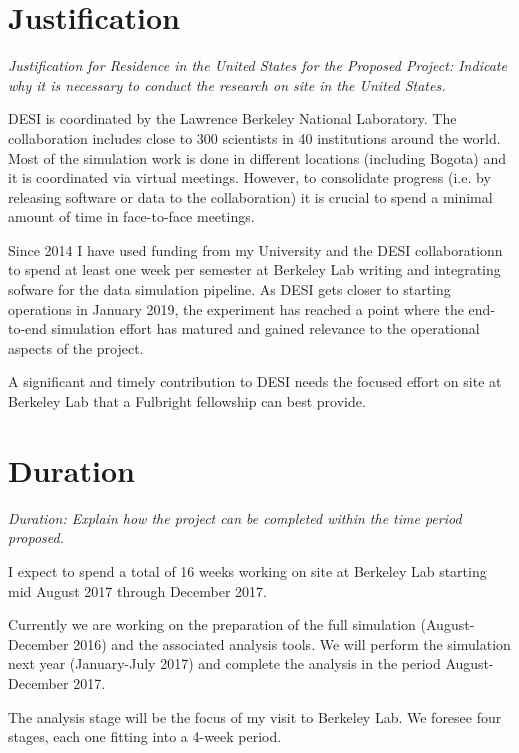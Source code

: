 \documentclass[12pt]{article}
\begin{document}
\section*{Justification}
\textit{Justification for Residence in the United States for the Proposed
Project: Indicate why it is necessary to conduct the research on site
 in the United States. }

DESI is coordinated by the Lawrence Berkeley National Laboratory. The
collaboration includes close to 300 scientists in 40 institutions
around the world. 
Most of the simulation work is done in different locations (including
Bogota) and it is coordinated via virtual meetings.  
However, to consolidate progress (i.e. by releasing software or data
to the collaboration) it is crucial to spend a minimal amount of time
in face-to-face meetings. 

Since 2014 I have used funding from my University and the DESI
collaborationn to spend at least one week per semester at
Berkeley Lab writing and integrating sofware for the data simulation
pipeline. 
As DESI gets closer to starting operations in January 2019, the
experiment has reached a point where the end-to-end simulation effort
has matured and gained relevance to the operational aspects of the
project. 

A significant and timely contribution to DESI needs the focused effort on
site at Berkeley Lab that a Fulbright fellowship can best provide. 

\section*{Duration}
\textit{ Duration: Explain how the project can be completed within the time
period proposed. }

I expect to spend a total of 16 weeks working on site at Berkeley
Lab starting mid August 2017 through December 2017. 

Currently we are working on the preparation of the full simulation
(August-December 2016) and the associated analysis tools. We will
perform the simulation next year (January-July 2017) and complete the
analysis in the period August-December 2017.  

The analysis stage will be the focus of my visit
to Berkeley Lab.
We foresee four stages, each one fitting into a 4-week period.
\end{document}
